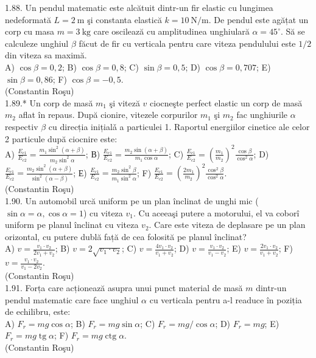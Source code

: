 1.88. Un pendul matematic este alcătuit dintr-un fir elastic cu lungimea nedeformată $L=2 \mathrm{~m}$ şi constanta elastică $k=10 \mathrm{~N} / \mathrm{m}$. De pendul este agățat un corp cu masa $m=3 \mathrm{~kg}$ care oscilează cu amplitudinea unghiulară $\alpha=45^{\circ}$. Să se calculeze unghiul $\beta$ făcut de fir cu verticala pentru care viteza pendulului este $1 / 2$ din viteza sa maximă.\\ A) $\cos \beta=0,2$; B) $\cos \beta=0,8$; C) $\sin \beta=0,5$; D) $\cos \beta=0,707$; E) $\sin \beta=0,86$; F) $\cos \beta=-0,5$.\\ (Constantin Roşu)\\

1.89.* Un corp de masă $m_{1}$ şi viteză $v$ ciocneşte perfect elastic un corp de masă $m_{2}$ aflat în repaus. După cionire, vitezele corpurilor $m_{1}$ şi $m_{2}$ fac unghiurile $\alpha$ respectiv $\beta$ cu direcția inițialǎ a particulei 1. Raportul energiilor cinetice ale celor 2 particule după ciocnire este:\\ A) $\frac{E_{c 1}}{E_{c 2}}=\frac{m_{1} \sin ^{2}(\alpha+\beta)}{m_{2} \sin ^{2} \alpha}$; В) $\frac{E_{c 1}}{E_{c 2}}=\frac{m_{2} \sin (\alpha+\beta)}{m_{1} \cos \alpha}$; C) $\frac{E_{c 1}}{E_{c 2}}=\left(\frac{m_{1}}{m_{2}}\right)^{2} \frac{\cos \beta}{\cos ^{2} \alpha}$; D) $\frac{E_{c 1}}{E_{c 2}}=\frac{m_{2} \sin ^{2}(\alpha+\beta)}{\sin ^{2}(\alpha-\beta)}$; Е) $\frac{E_{c 1}}{E_{c 2}}=\frac{m_{2} \sin ^{2} \beta}{m_{1} \sin ^{2} \alpha}$; F) $\frac{E_{c 1}}{E_{c 2}}=\left(\frac{2 m_{1}}{m_{2}}\right)^{2} \frac{\cos ^{2} \beta}{\cos ^{2} \alpha}$.\\ (Constantin Roşu)\\

1.90. Un automobil urcă uniform pe un plan înclinat de unghi mic ($\sin \alpha=\alpha, \cos \alpha=1$) cu viteza $v_{1}$. Cu aceeaşi putere a motorului, el va coborî uniform pe planul înclinat cu viteza $v_{2}$. Care este viteza de deplasare pe un plan orizontal, cu putere dublă față de cea folosită pe planul înclinat?\\ A) $v=\frac{v_{1} \cdot v_{2}}{2 v_{1}+v_{2}}$; B) $v=2 \sqrt{v_{1} \cdot v_{2}}$; C) $v=\frac{4 v_{1} \cdot v_{2}}{v_{1}+v_{2}}$; D) $v=\frac{v_{1} \cdot v_{2}}{v_{1}-v_{2}}$; E) $v=\frac{2 v_{1} \cdot v_{2}}{v_{1}+v_{2}}$; F) $v=\frac{v_{1} \cdot v_{2}}{v_{1}-2 v_{2}}$.\\ (Constantin Roşu)\\

1.91. Forța care acționează asupra unui punct material de masă $m$ dintr-un pendul matematic care face unghiul $\alpha$ cu verticala pentru a-l readuce în poziția de echilibru, este:\\ A) $F_{r}=m g \cos \alpha$; B) $F_{r}=m g \sin \alpha$; C) $F_{r}=m g / \cos \alpha$; D) $F_{r}=m g$; E) $F_{r}=m g \operatorname{tg} \alpha$; F) $F_{r}=m g \operatorname{ctg} \alpha$.\\ (Constantin Roşu)\\

